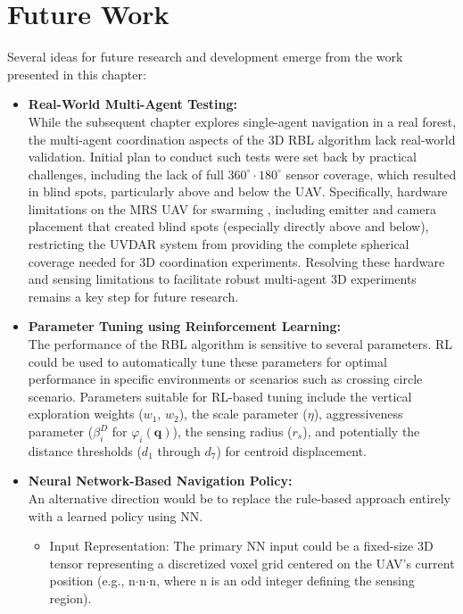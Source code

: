     \section{Future Work}
        Several ideas for future research and development emerge from the work presented in this chapter:
        \begin{itemize}
            \item \textbf{Real-World Multi-Agent Testing: } \\
            While the subsequent chapter explores single-agent navigation in a real forest, the multi-agent coordination aspects of the 3D RBL algorithm lack real-world validation. 
            Initial plan to conduct such tests were set back by practical challenges, including the lack of full $360^{\circ} \cdot 180^{\circ}$ sensor coverage, which resulted in blind spots, particularly above and below the \ac{UAV}.
            Specifically, hardware limitations on the \ac{MRS} \ac{UAV} for swarming \cite{robofly}, including emitter and camera placement that created blind spots (especially directly above and below), restricting the UVDAR system \cite{uvdar_package} from providing the complete spherical coverage needed for 3D coordination experiments.
            Resolving these hardware and sensing limitations to facilitate robust multi-agent 3D experiments remains a key step for future research.
            \item \textbf{Parameter Tuning using Reinforcement Learning: } \\
            The performance of the \ac{RBL} algorithm is sensitive to several parameters. 
            \ac{RL} could be used to automatically tune these parameters for optimal performance in specific environments or scenarios such as crossing circle scenario. 
            Parameters suitable for \ac{RL}-based tuning include the vertical exploration weights ($w_1$, $w_2$), the scale parameter ($\eta$), aggressiveness parameter ($\beta_i^D$ for $\varphi_i(\mathbf{q})$), the sensing radius ($r_s$), and potentially the distance thresholds ($d_1$ through $d_7$) for centroid displacement.
            \item \textbf{Neural Network-Based Navigation Policy: } \\
                An alternative direction would be to replace the rule-based approach entirely with a learned policy using \ac{NN}.
                \begin{itemize}
                    \item Input Representation: The primary \ac{NN} input could be a fixed-size 3D tensor representing a discretized voxel grid centered on the \ac{UAV}'s current position (e.g., n$\cdot$n$\cdot$n, where n is an odd integer defining the sensing region). 

\end{itemize}
\end{itemize}
